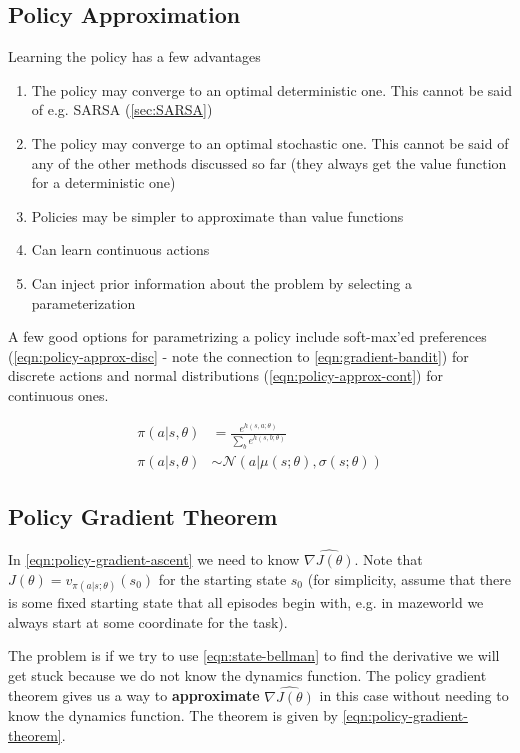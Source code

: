 \documentclass[11pt]{report}
\begin{document}
\subsection{Policy Approximation}
Learning the policy has a few advantages
\begin{enumerate}
	\item The policy may converge to an optimal deterministic one. This cannot be said of e.g. SARSA (\autoref{sec:SARSA})
	\item The policy may converge to an optimal stochastic one. This cannot be said of any of the other methods discussed so far (they always get the value function for a deterministic one)
	\item Policies may be simpler to approximate than value functions
	\item Can learn continuous actions
	\item Can inject prior information about the problem by selecting a parameterization
\end{enumerate}

A few good options for parametrizing a policy include soft-max'ed preferences (\autoref{eqn:policy-approx-disc} - note the connection to \autoref{eqn:gradient-bandit}) for discrete actions and normal distributions (\autoref{eqn:policy-approx-cont}) for continuous ones.

\begin{align}
	\label{eqn:policy-approx-disc}
	\pi(a | s, \theta) &= \frac{e^{h(s, a; \theta)}}{\sum_b e^{h(s, b; \theta)}}\\
	\label{eqn:policy-approx-cont}
	\pi(a | s, \theta) &\sim \mathcal{N}(a | \mu(s; \theta), \sigma(s; \theta))
\end{align}

\subsection{Policy Gradient Theorem}\label{sec:policy-gradient-theorem}
In \autoref{eqn:policy-gradient-ascent} we need to know $\widehat{\nabla J(\theta)}$. Note that $J(\theta) = v_{\pi(a|s;\theta)}(s_0)$ for the starting state $s_0$ (for simplicity, assume that there is some fixed starting state that all episodes begin with, e.g. in mazeworld we always start at some coordinate for the task).

The problem is if we try to use \autoref{eqn:state-bellman} to find the derivative we will get stuck because we do not know the dynamics function. The policy gradient theorem gives us a way to \textbf{approximate} $\widehat{\nabla{J(\theta)}}$ in this case without needing to know the dynamics function. The theorem is given by \autoref{eqn:policy-gradient-theorem}.
\end{document}
